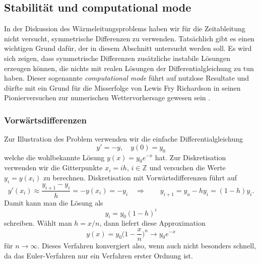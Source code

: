 %
%
%
\subsection{Stabilität und computational mode
\label{pde:subsection:stabilitaet}}
In der Diskussion des Wärmeleitungsproblems haben wir für die Zeitableitung
nicht versucht, symmetrische Differenzen zu verwenden.
Tatsächlich gibt es einen wichtigen Grund dafür, der in diesem Abschnitt
untersucht werden soll.
Es wird sich zeigen, dass symmetrische Differenzen zusätzliche instabile
Lösungen erzeugen können, die nichts mit realen Lösungen der
Differentialgleichung zu tun haben.
%
%
Dieser sogenannte {\em computational mode}
%
führt auf nutzlose Resultate und dürfte mit ein Grund für die Misserfolge
von Lewis Fry Richardson in seinen Pionierversuchen zur numerischen
Wettervorhersage gewesen sein
\cite{buch:richardson}.
%
%

\subsubsection{Vorwärtsdifferenzen}
Zur Illustration des Problem verwenden wir die einfache Differentialgleichung
\[
y' = -y,\quad y(0)=y_0
\]
welche die wohlbekannte Lösung $y(x)=y_0e^{-x}$ hat.
Zur Diskretisation verwenden wir die Gitterpunkte $x_i=ih$, $i\in\mathbb Z$
und versuchen die Werte $y_i = y(x_i)$ zu berechnen.
Diskretisation mit Vorwärtsdifferenzen führt auf 
\[
y'(x_i) \approx \frac{y_{i+1}-y_i}{h} = -y(x_i) = -y_i
\quad\Rightarrow\qquad
y_{i+1} = y_u-hy_i = (1-h)y_i.
\]
Damit kann man die Lösung als 
\[
y_i = y_0(1-h)^i
\]
schreiben.
Wählt man $h=x/n$, dann liefert diese Approximation
\[
y(x) = y_0\biggl(1-\frac{x}n\biggr)^n 
\to
y_0e^{-x}
\]
für $n\to\infty$.
Dieses Verfahren konvergiert also, wenn auch nicht besonders schnell,
da das Euler-Verfahren nur ein Verfahren erster Ordnung ist.
%


